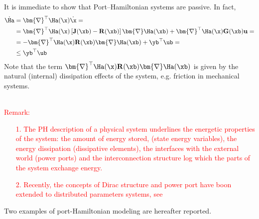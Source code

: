 It is immediate to show that Port--Hamiltonian systems are passive. In fact,
%
\begin{align}
    \dot{\Ha} &= \bm{\nabla}^\top\Ha(\x)\dot{\x} = \\
              &= \bm{\nabla}^\top\Ha(\x)\left[\mathbf{J}(\xb) - \mathbf{R}(\xb)\right]\bm{\nabla}\Ha(\xb) + \bm{\nabla}^\top\Ha(\x)\mathbf{G}(\xb)\mathbf{u} = \\
              &= -\bm{\nabla}^\top\Ha(\x)\mathbf{R}(\xb)\bm{\nabla}\Ha(\xb) + \yb^\top\ub = \\
              &\leq \yb^\top\ub
\end{align}
%
Note that the term $\bm{\nabla}^\top\Ha(\x)\mathbf{R}(\xb)\bm{\nabla}\Ha(\xb)$ is given by the natural (internal) dissipation effects of the system, e.g. friction in mechanical systems.
%
\textcolor{red}{
\\Remark:
\begin{itemize}
	\item [1.] The PH description of a physical system underlines the energetic properties of the system: the amount of energy stored, (state energy variables), the energy dissipation (dissipative elements), the interfaces with the external world (power ports) and the interconnection structure log which the parts of the system exchange energy.
	\item [2.] Recently, the concepts of Dirac structure and power port have boon extended to distributed parameters systems, see \cite{MASCHKE200027,maschke2001hamiltonian,rodriguez2001stabilization,macchelli2003port,macchelli2004modeling,macchelli2004port,macchelli2004port2}
\end{itemize}}
%
Two examples of port-Hamiltonian modeling are hereafter reported.  
%
